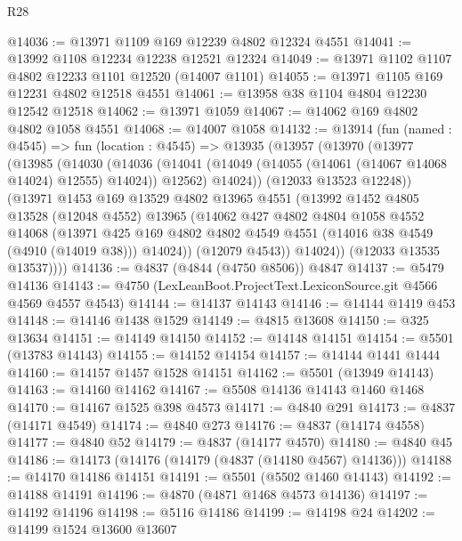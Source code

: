\begin{lexlean}{R28}
\begin{coremodule}
@14036 := @13971 @1109 @169 @12239 @4802 @12324 @4551
@14041 := @13992 @1108 @12234 @12238 @12521 @12324
@14049 := @13971 @1102 @1107 @4802 @12233 @1101 @12520 (@14007 @1101)
@14055 := @13971 @1105 @169 @12231 @4802 @12518 @4551
@14061 := @13958 @38 @1104 @4804 @12230 @12542 @12518
@14062 := @13971 @1059
@14067 := @14062 @169 @4802 @4802 @1058 @4551
@14068 := @14007 @1058
@14132 := @13914
    (fun (named : @4545) =>
    fun (location : @4545) =>
    @13935
      (@13957
        (@13970
          (@13977
            (@13985
              (@14030
                (@14036
                  (@14041 (@14049 (@14055 (@14061 (@14067 @14068 @14024) @12555) @14024)) @12562)
                  @14024))
              (@12033 @13523 @12248))
            (@13971
              @1453
              @169
              @13529
              @4802
              @13965
              @4551
              (@13992
                @1452
                @4805
                @13528
                (@12048 @4552)
                @13965
                (@14062
                  @427
                  @4802
                  @4804
                  @1058
                  @4552
                  @14068
                  (@13971
                    @425
                    @169
                    @4802
                    @4802
                    @4549
                    @4551
                    (@14016 @38 @4549 (@4910 (@14019 @38)))
                    @14024))
                (@12079 @4543))
              @14024))
          (@12033 @13535 @13537))))
@14136 := @4837 (@4844 (@4750 @8506)) @4847
@14137 := @5479 @14136
@14143 := @4750 (LexLeanBoot.ProjectText.LexiconSource.git @4566 @4569 @4557 @4543)
@14144 := @14137 @14143
@14146 := @14144 @1419 @453
@14148 := @14146 @1438 @1529
@14149 := @4815 @13608
@14150 := @325 @13634
@14151 := @14149 @14150
@14152 := @14148 @14151
@14154 := @5501 (@13783 @14143)
@14155 := @14152 @14154
@14157 := @14144 @1441 @1444
@14160 := @14157 @1457 @1528 @14151
@14162 := @5501 (@13949 @14143)
@14163 := @14160 @14162
@14167 := @5508 @14136 @14143 @1460 @1468
@14170 := @14167 @1525 @398 @4573
@14171 := @4840 @291
@14173 := @4837 (@14171 @4549)
@14174 := @4840 @273
@14176 := @4837 (@14174 @4558)
@14177 := @4840 @52
@14179 := @4837 (@14177 @4570)
@14180 := @4840 @45
@14186 := @14173 (@14176 (@14179 (@4837 (@14180 @4567) @14136)))
@14188 := @14170 @14186 @14151
@14191 := @5501 (@5502 @1460 @14143)
@14192 := @14188 @14191
@14196 := @4870 (@4871 @1468 @4573 @14136)
@14197 := @14192 @14196
@14198 := @5116 @14186
@14199 := @14198 @24
@14202 := @14199 @1524 @13600 @13607

\end{coremodule}
\end{lexlean}

